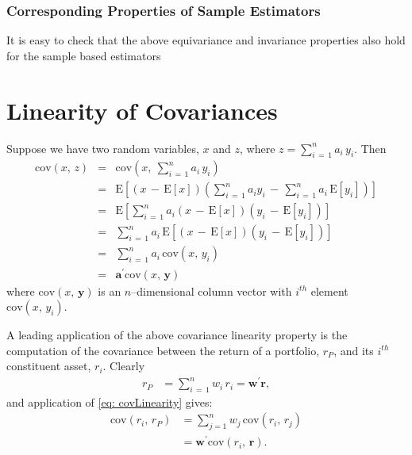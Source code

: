 \documentclass[graybox,envcountchap,sectrefs]{svmono}\usepackage[]{graphicx}\usepackage[]{xcolor}
\begin{document}
\begin{appendices}
\subsubsection*{Corresponding Properties of Sample Estimators}

It is easy to check that the above equivariance and invariance properties
also hold for the sample based estimators

\section{Linearity of Covariances\label{sec: covarianceLinearity}}

Suppose we have two random variables, $x$ and $z$, where $z=\sum_{i\,=\,1}^{n}a_{i}\,y_{i}$.
Then
\begin{eqnarray}
\mathrm{cov}(x,\,z) & = & \mathrm{cov}\left(x,\ \sum_{i\,=\,1}^{n}a_{i}\,y_{i}\right)\nonumber \\
 & = & \mathrm{E}\left[\left(x\,-\,\mathrm{E\left[\mathit{x}\right]}\right)\left(\sum_{i\,=\,1}^{n}a_{i}y_{i}\,-\,\sum_{i\,=\,1}^{n}a_{i}\,\mathrm{E}\left[y_{i}\right]\right)\right]\nonumber \\
 & = & \mathrm{E}\left[\sum_{i\,=\,1}^{n}a_{i}\left(x\,-\,\mathrm{E}\left[x\right]\right)\left(y_{i}\,-\,\mathrm{E}\left[y_{i}\right]\right)\right]\nonumber \\
 & = & \sum_{i\,=\,1}^{n}a_{i}\,\mathrm{E}\left[\left(x\,-\,\mathrm{E}\left[x\right]\right)\left(y_{i}\,-\,\mathrm{E}\left[y_{i}\right]\right)\right]\nonumber \\
 & = & \sum_{i\,=\,1}^{n}a_{i}\,\mathrm{cov}(x,\,y_{i})\nonumber \\
 & = & \mathbf{a^{\prime}}\mathrm{cov}(x,\,\mathbf{y})\label{eq: covLinearity}
\end{eqnarray}
where $\mathrm{cov}(x,\,\mathbf{y})$ is an $n$--dimensional column
vector with $i^{th}$ element $\mathrm{cov}(x,\,y_{i})$.

A leading application of the above covariance linearity property is
the computation of the covariance between the return of a portfolio,
$r_{P}$, and its $i^{th}$ constituent asset, $r_{i}$. Clearly
\begin{align}
r_{P} & =\sum_{i\,=\,1}^{n}w_{i}\,r_{i}=\mathbf{w}^{\prime}\mathbf{r},\label{eq:PortReturn}
\end{align}
and application of \eqref{eq: covLinearity} gives:
\begin{align}
\mathrm{cov}(r_{i},\,r_{P}) & =\sum_{j=1}^{n}w_{j}\,\mathrm{cov}(r_{i},\,r_{j})\nonumber \\
 & =\mathbf{w}^{\prime}\mathrm{cov}(r_{i},\,\mathbf{r}).\label{eq: covAssetWithPortfolio}
\end{align}



\end{appendices}
\end{document}
